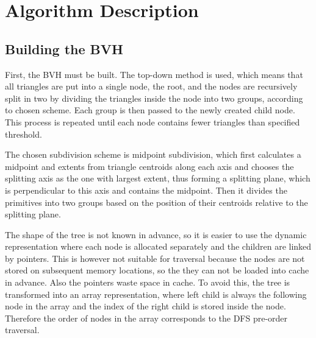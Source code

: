 \documentclass[report,11pt]{elsarticle}
\begin{document}
\section{\label{SEC:Description}Algorithm Description}
\subsection{Building the BVH}
First, the BVH must be built. The top-down method is used, which means that all triangles are put into a single node, the root, and the nodes are recursively split in two by dividing the triangles inside the node into two groups, according to chosen scheme. Each group is then passed to the newly created child node. This process is repeated until each node contains fewer triangles than specified threshold.

The chosen subdivision scheme is midpoint subdivision, which first calculates a midpoint and extents from triangle centroids along each axis and chooses the splitting axis as the one with largest extent, thus forming a splitting plane, which is perpendicular to this axis and contains the midpoint. Then it divides the primitives into two groups based on the position of their centroids relative to the splitting plane.

The shape of the tree is not known in advance, so it is easier to use the dynamic representation where each node is allocated separately and the children are linked by pointers. This is however not suitable for traversal because the nodes are not stored on subsequent memory locations, so the they can not be loaded into cache in advance. Also the pointers waste space in cache. To avoid this, the tree is transformed into an array representation, where left child is always the following node in the array and the index of the right child is stored inside the node. Therefore the order of nodes in the array corresponds to the DFS pre-order traversal.
\end{document}
